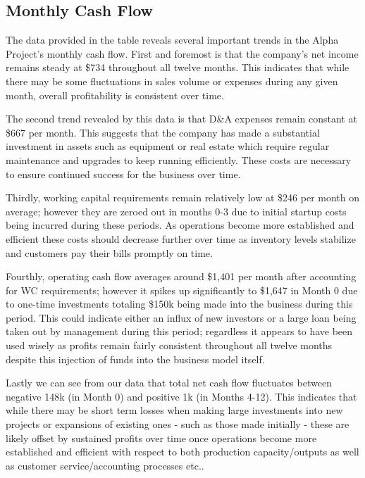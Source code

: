 

\subsection{Monthly Cash Flow}\label{sec:title}

The data provided in the table reveals several important trends in the Alpha Project's monthly cash flow. First and foremost is that the company's net income remains steady at \$734 throughout all twelve months. This indicates that while there may be some fluctuations in sales volume or expenses during any given month, overall profitability is consistent over time. 

The second trend revealed by this data is that D\&A expenses remain constant at \$667 per month. This suggests that the company has made a substantial investment in assets such as equipment or real estate which require regular maintenance and upgrades to keep running efficiently. These costs are necessary to ensure continued success for the business over time. 

Thirdly, working capital requirements remain relatively low at \$246 per month on average; however they are zeroed out in months 0-3 due to initial startup costs being incurred during these periods. As operations become more established and efficient these costs should decrease further over time as inventory levels stabilize and customers pay their bills promptly on time. 

Fourthly, operating cash flow averages around \$1,401 per month after accounting for WC requirements; however it spikes up significantly to \$1,647 in Month 0 due to one-time investments totaling \$150k being made into the business during this period. This could indicate either an influx of new investors or a large loan being taken out by management during this period; regardless it appears to have been used wisely as profits remain fairly consistent throughout all twelve months despite this injection of funds into the business model itself.  

 Lastly we can see from our data that total net cash flow fluctuates between negative 148k (in Month 0) and positive 1k (in Months 4-12). This indicates that while there may be short term losses when making large investments into new projects or expansions of existing ones - such as those made initially - these are likely offset by sustained profits over time once operations become more established and efficient with respect to both production capacity/outputs as well as customer service/accounting processes etc..  


